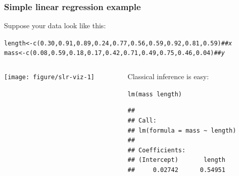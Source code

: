 \documentclass[color=usenames,dvipsnames]{beamer}\usepackage[]{graphicx}\usepackage[]{xcolor}
\makeatletter
\newcommand{\hlnum}[1]{\textcolor[rgb]{0.69,0.494,0}{#1}}%
\newcommand{\hlcom}[1]{\textcolor[rgb]{0.514,0.506,0.514}{\textit{#1}}}%
\newcommand{\hlopt}[1]{\textcolor[rgb]{0,0,0}{#1}}%
\newcommand{\hlstd}[1]{\textcolor[rgb]{0,0,0}{#1}}%
\newcommand{\hlkwb}[1]{\textcolor[rgb]{0,0.341,0.682}{#1}}%
\newcommand{\hlkwd}[1]{\textcolor[rgb]{0.004,0.004,0.506}{#1}}%
\newenvironment{kframe}{%
 \def\at@end@of@kframe{}%
 \ifinner\ifhmode%
  \def\at@end@of@kframe{\end{minipage}}%
  \begin{minipage}{\columnwidth}%
 \fi\fi%
 \def\FrameCommand##1{\hskip\@totalleftmargin \hskip-\fboxsep
 \colorbox{shadecolor}{##1}\hskip-\fboxsep
     \hskip-\linewidth \hskip-\@totalleftmargin \hskip\columnwidth}%
 \MakeFramed {\advance\hsize-\width
   \@totalleftmargin\z@ \linewidth\hsize
   \@setminipage}}%
 {\par\unskip\endMakeFramed%
 \at@end@of@kframe}
\newenvironment{knitrout}{}{} %
\makeatother
\begin{document}
\begin{frame}[fragile]
  \frametitle{Simple linear regression example}
  Suppose your data look like this:
\begin{knitrout}\tiny
{}\color{fgcolor}\begin{kframe}
\begin{alltt}
\hlstd{length} \hlkwb{<-} \hlkwd{c}\hlstd{(}\hlnum{0.30}\hlstd{,} \hlnum{0.91}\hlstd{,} \hlnum{0.89}\hlstd{,} \hlnum{0.24}\hlstd{,} \hlnum{0.77}\hlstd{,} \hlnum{0.56}\hlstd{,} \hlnum{0.59}\hlstd{,} \hlnum{0.92}\hlstd{,} \hlnum{0.81}\hlstd{,} \hlnum{0.59}\hlstd{)}  \hlcom{## x}
\hlstd{mass} \hlkwb{<-} \hlkwd{c}\hlstd{(}\hlnum{0.08}\hlstd{,} \hlnum{0.59}\hlstd{,} \hlnum{0.18}\hlstd{,} \hlnum{0.17}\hlstd{,} \hlnum{0.42}\hlstd{,} \hlnum{0.71}\hlstd{,} \hlnum{0.49}\hlstd{,} \hlnum{0.75}\hlstd{,} \hlnum{0.46}\hlstd{,} \hlnum{0.04}\hlstd{)}    \hlcom{## y}
\end{alltt}
\end{kframe}
\end{knitrout}
\begin{columns}
  \begin{column}{0.5\textwidth}
\begin{knitrout}
\color{fgcolor}
\texttt{[image: figure/slr-viz-1]} 
\end{knitrout}
  \end{column}
  \pause
  \begin{column}{0.5\textwidth}
    Classical inference is easy:
\begin{knitrout}\scriptsize
{}\color{fgcolor}\begin{kframe}
\begin{alltt}
\hlkwd{lm}\hlstd{(mass}\hlopt{~}\hlstd{length)}
\end{alltt}
\begin{verbatim}
## 
## Call:
## lm(formula = mass ~ length)
## 
## Coefficients:
## (Intercept)       length  
##     0.02742      0.54951
\end{verbatim}
\end{kframe}
\end{knitrout}
  \end{column}
\end{columns}
\end{frame}
\end{document}
